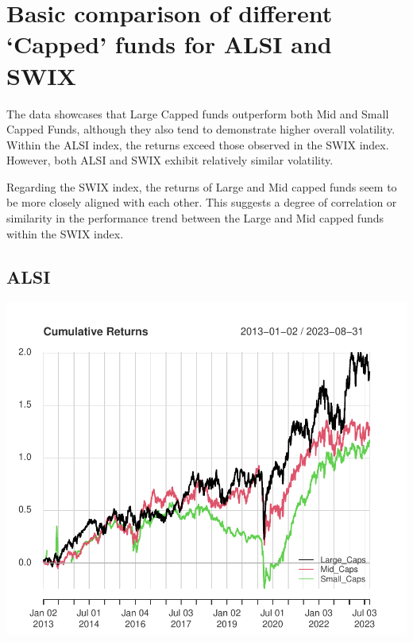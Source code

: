 \documentclass[11pt,preprint, authoryear]{elsarticle}
\numberwithin{equation}{section}
\numberwithin{figure}{section}
\numberwithin{table}{section}
\begin{document}
\setcounter{footnote}{0}



\pagestyle{fancy}
\chead{}
\rhead{}
\lfoot{}
\lhead{}
\cfoot{}


\headsep 35pt %




\hypertarget{basic-comparison-of-different-capped-funds-for-alsi-and-swix}{%
\section{Basic comparison of different `Capped' funds for ALSI and
SWIX}\label{basic-comparison-of-different-capped-funds-for-alsi-and-swix}}

The data showcases that Large Capped funds outperform both Mid and Small
Capped Funds, although they also tend to demonstrate higher overall
volatility. Within the ALSI index, the returns exceed those observed in
the SWIX index. However, both ALSI and SWIX exhibit relatively similar
volatility.

Regarding the SWIX index, the returns of Large and Mid capped funds seem
to be more closely aligned with each other. This suggests a degree of
correlation or similarity in the performance trend between the Large and
Mid capped funds within the SWIX index.

\hypertarget{alsi}{%
\subsection{ALSI}\label{alsi}}

\includegraphics{Question-3_files/figure-latex/unnamed-chunk-1-1.pdf}
\end{document}
